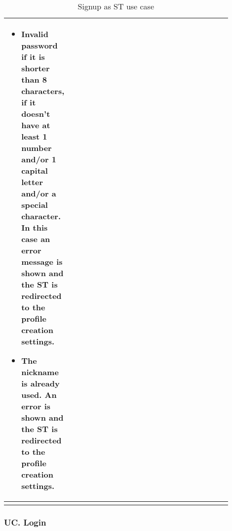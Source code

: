 \begin{center}
\begin{longtable}{|l|p{0.9\linewidth}|}
\begin{itemize}
            \item Invalid password if it is shorter than 8 characters, if it doesn’t have at least 1 number and/or 1 capital letter and/or a special character. In this case an error message is shown and the ST is redirected to the profile creation settings.
            \item The nickname is already used. An error is shown and the ST is redirected to the profile creation settings.
        \end{itemize}    \\
        \hline
        \caption{Signup as ST use case}
        \label{tab: signup_as_ST_use_case}
    \end{longtable}
\end{center}

\subsubsection*{UC\cuc . Login}
